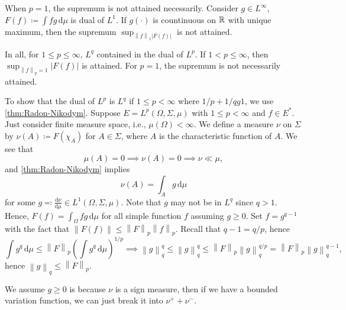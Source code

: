 \begin{remark}
	When \(p = 1\), the supremum is not attained necessarily. Consider \(g\in L^{\infty} \), \(F(f) \coloneqq \int fg\,\mathrm{d} \mu \) is dual of \(L^1\). If \(g(\cdot)\) is countinuous on \(\mathbb{\MakeUppercase{r}} \) with unique maximum, then the supremum \(\sup _{\left\lVert f\right\rVert _1 \left\vert F(f) \right\vert }\) is not attained.
\end{remark}

\begin{note}
	In all, for \(1 \leq p\leq \infty \), \(L^q\) contained in the dual of \(L^p\). If \(1 < p \leq \infty \), then \(\sup _{\left\lVert f\right\rVert _p = 1} \left\vert F(f) \right\vert \) is attained. For \(p = 1\), the supremum is not necessarily attained.
\end{note}

To show that the dual of \(L^p\) is \(L^q\) if \(1 \leq p < \infty \) where \(1 / p + 1 / q g 1\), we use \autoref{thm:Radon-Nikodym}. Suppose \(E = L^p(\Omega , \Sigma , \mu )\) with \(1 \leq p < \infty \) and \(f\in E^{\ast} \). Just consider finite measure space, i.e., \(\mu (\Omega ) < \infty \). We define a measure \(\nu \) on \(\Sigma \) by \(\nu (A) \coloneqq F(\chi _A)\) for \(A\in \Sigma \), where \(A\) is the characteristic function of \(A\). We see that
\[
	\mu (A) = 0 \implies \nu (A) = 0 \implies \nu \ll \mu,
\]
and \autoref{thm:Radon-Nikodym} implies
\[
	\nu (A) = \int _A g\,\mathrm{d} \mu
\]
for some \(g \eqqcolon \frac{\mathrm{d}\nu }{\mathrm{d}\mu } \in L^1(\Omega , \Sigma , \mu )\). Note that \(g\) may not be in \(L^q\) since \(q > 1\). Hence, \(F(f)= \int _\Omega fg \,\mathrm{d} \mu \) for all simple function \(f\) assuming \(g \geq 0\). Set \(f = g^{q - 1}\) with the fact that \(\left\lVert F(f)\right\rVert \leq \left\lVert F\right\rVert _p \left\lVert f\right\rVert _p\). Recall that \(q - 1 = q / p\), hence
\[
	\int g^q\,\mathrm{d} \mu \leq \left\lVert F\right\rVert _p \left( \int g^q \,\mathrm{d} \mu  \right) ^{1 / p} \implies \left\lVert g\right\rVert _q ^q \leq \left\lVert g\right\rVert _q^q \leq \left\lVert F\right\rVert _p \left\lVert g\right\rVert _q ^{q / p} = \left\lVert F\right\rVert _p \left\lVert g\right\rVert _q ^{q - 1},
\]
hence \(\left\lVert g\right\rVert _q \leq \left\lVert F\right\rVert _p\).

\begin{note}
	We assume \(g \geq 0\) is because \(\nu \) is a sign measure, then if we have a bounded variation function, we can just break it into \(\nu ^+ + \nu ^-\).
\end{note}

